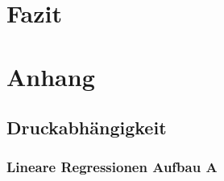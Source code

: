 \documentclass[12pt,a4paper]{article}
\begin{document}
\section{Fazit}

\section{Anhang}

\subsection{Druckabhängigkeit}

\subsubsection{Lineare Regressionen Aufbau A}
\end{document}
